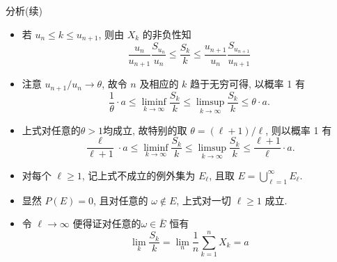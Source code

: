 \begin{frame}{分析(续)}
\begin{itemize}[<+-|alert@+>]
\item 若 \( u_{n} \leq k \leq u_{n+1} \), 则由 \( X_{k} \) 的非负性知
\[
\frac{u_{n}}{u_{n+1}} \frac{S_{u_{n}}}{u_{n}} \leq \frac{S_{k}}{k} \leq \frac{u_{n+1}}{u_{n}} \frac{S_{u_{n+1}}}{u_{n+1}}
\]

\item 注意 \( u_{n+1} / u_{n} \rightarrow \theta \), 故令 \( n\) 及相应的 \( k \) 趋于无穷可得, 以概率 1 有
\[
\frac{1}{\theta} \cdot a \leq \liminf_{k\rightarrow\infty} \frac{S_{k}}{k} \leq \limsup_{k\rightarrow\infty} \frac{S_{k}}{k} \leq \theta\cdot a.
\]
\item 上式对任意的$\theta>1$均成立, 故特别的取 \( \theta=(\ell+1) / \ell \), 则以概率 1 有
\[
\frac{\ell}{\ell+1} \cdot a  \leq \liminf_{k\rightarrow\infty} \frac{S_{k}}{k} \leq \limsup_{k\rightarrow\infty} \frac{S_{k}}{k} \leq \frac{\ell+1}{\ell} \cdot a .
\]

\item 对每个 \( \ell \geq 1 \), 记上式不成立的例外集为 \( E_{\ell} \), 且取 \( E=\bigcup_{\ell=1}^{\infty} E_{\ell} \).
\item 显然 \( P(E)=0 \), 且对任意的 \(\omega\notin E \), 上式对一切 \( \ell \geq 1 \) 成立.
\item 令 \( \ell \rightarrow \infty \) 便得证对任意的\(\omega\in \bar{E} \) 恒有
\[
\lim _{k} \frac{S_{k}}{k}=\lim _{n} \frac{1}{n} \sum_{k=1}^{n} X_{k}=a
\]
\end{itemize}



\end{frame}

